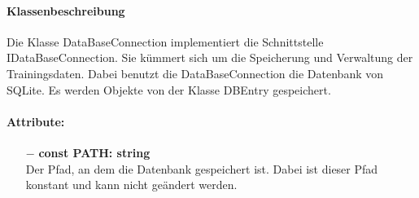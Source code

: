\documentclass[a4paper,12pt]{article}
\begin{document}
	\paragraph{Klassenbeschreibung}
	Die Klasse DataBaseConnection implementiert die Schnittstelle IDataBaseConnection. Sie kümmert sich um die Speicherung und Verwaltung der Trainingsdaten. Dabei benutzt die DataBaseConnection die \gls{Datenbank} von SQLite. Es werden Objekte von der Klasse DBEntry gespeichert. 
	
	\paragraph{Attribute:}
	\begin{itemize}
		\item[$-$] \textbf{const PATH: string}\\Der Pfad, an dem die Datenbank gespeichert ist. Dabei ist dieser Pfad konstant und kann nicht geändert werden.
	\end{itemize}
\end{document}
